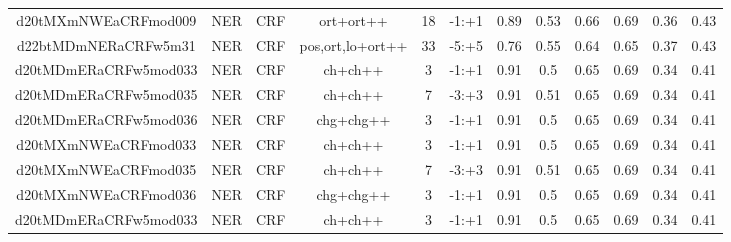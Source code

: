 \documentclass[a4paper]{article}
\begin{document}
\begin{landscape}
\begin{center}
\begin{tabular}{ |c|c|c|c|c|c|c|c|c|c|c|c|}
 	
 
 	
 		
 		\small{ d20tMXmNWEaCRFmod009 } & NER & CRF & ort+ort++  &  18 &  -1:+1  &  0.89 & 0.53 & 0.66  &  0.69 & 0.36 & 0.43 \\
 		

 	
 
 	
 		
 		\small{ d22btMDmNERaCRFw5m31 } & NER & CRF & pos,ort,lo+ort++  &  33 &  -5:+5  &  0.76 & 0.55 & 0.64  &  0.65 & 0.37 & 0.43 \\
 		

 	
 
 	
 		
 		\small{ d20tMDmERaCRFw5mod033 } & NER & CRF & ch+ch++  &  3 &  -1:+1  &  0.91 & 0.5 & 0.65  &  0.69 & 0.34 & 0.41 \\
 		

 	
 
 	
 		
 		\small{ d20tMDmERaCRFw5mod035 } & NER & CRF & ch+ch++  &  7 &  -3:+3  &  0.91 & 0.51 & 0.65  &  0.69 & 0.34 & 0.41 \\
 		

 	
 
 	
 		
 		\small{ d20tMDmERaCRFw5mod036 } & NER & CRF & chg+chg++  &  3 &  -1:+1  &  0.91 & 0.5 & 0.65  &  0.69 & 0.34 & 0.41 \\
 		

 	
 
 	
 		
 		\small{ d20tMXmNWEaCRFmod033 } & NER & CRF & ch+ch++  &  3 &  -1:+1  &  0.91 & 0.5 & 0.65  &  0.69 & 0.34 & 0.41 \\
 		

 	
 
 	
 		
 		\small{ d20tMXmNWEaCRFmod035 } & NER & CRF & ch+ch++  &  7 &  -3:+3  &  0.91 & 0.51 & 0.65  &  0.69 & 0.34 & 0.41 \\
 		

 	
 
 	
 		
 		\small{ d20tMXmNWEaCRFmod036 } & NER & CRF & chg+chg++  &  3 &  -1:+1  &  0.91 & 0.5 & 0.65  &  0.69 & 0.34 & 0.41 \\
 		

 	
 
 	
 		
 		\small{ d20tMDmERaCRFw5mod033 } & NER & CRF & ch+ch++  &  3 &  -1:+1  &  0.91 & 0.5 & 0.65  &  0.69 & 0.34 & 0.41 \\
 		


\end{tabular}
\end{center}
\end{landscape}
\end{document}
